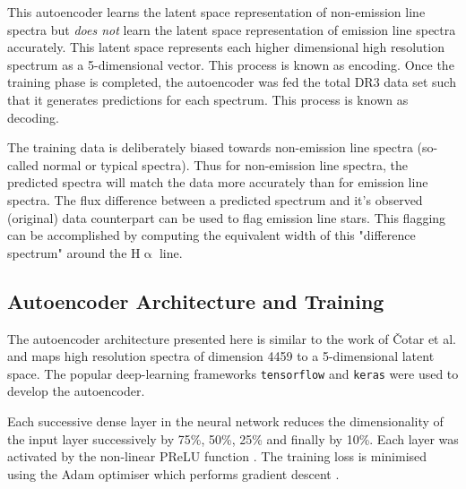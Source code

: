 This autoencoder learns the latent space representation of non-emission line spectra but \emph{does not} learn the latent space representation of emission line spectra accurately. This latent space represents each higher dimensional high resolution spectrum as a 5-dimensional vector. This process is known as encoding. Once the training phase is completed, the autoencoder was fed the total DR3 data set such that it generates predictions for each spectrum. This process is known as decoding. 

The training data is deliberately biased towards non-emission line spectra (so-called normal or typical spectra). Thus for non-emission line spectra, the predicted spectra will match the data more accurately than for emission line spectra. The flux difference between a predicted spectrum and it's observed (original) data counterpart can be used to flag emission line stars. This flagging can be accomplished by computing the equivalent width of this "difference spectrum" around the H$\upalpha$ line.

\subsection{Autoencoder Architecture and Training}

The autoencoder architecture presented here is similar to the work of Čotar et al. and maps high resolution spectra of dimension 4459 to a 5-dimensional latent space. The popular deep-learning frameworks \texttt{tensorflow}\cite{tensorflow2015-whitepaper} and \texttt{keras}\cite{chollet2015keras} were used to develop the autoencoder.

Each successive dense layer in the neural network reduces the dimensionality of the input layer successively by 75\%, 50\%, 25\% and finally by 10\%. Each layer was activated by the non-linear PReLU function \cite{he2015delving}. The training loss is minimised using the Adam optimiser which performs gradient descent \cite{kingma2014adam}.

